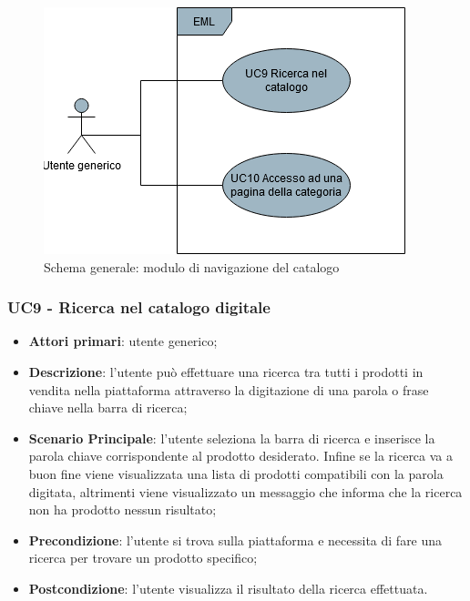 \begin{figure}[H]
\centering
\includegraphics[scale=0.6]{res/UseCase/Immagini/NavigazioneCatalogoGenerale}
\caption{Schema generale: modulo di navigazione del catalogo}
\end{figure}
\subsubsection{UC9 - Ricerca nel catalogo digitale}
\begin{itemize}
\item \textbf{Attori primari}: utente generico;
\item \textbf{Descrizione}: l'utente può effettuare una ricerca tra tutti i prodotti in vendita nella piattaforma attraverso la digitazione di una parola o frase chiave nella barra di ricerca;
\item \textbf{Scenario Principale}: l'utente seleziona la barra di ricerca e inserisce la parola chiave corrispondente al prodotto desiderato. Infine se la ricerca va a buon fine viene visualizzata una lista di prodotti compatibili con la parola digitata, altrimenti viene visualizzato un messaggio che informa che la ricerca non ha prodotto nessun risultato;
\item \textbf{Precondizione}: l'utente si trova sulla piattaforma e necessita di fare una ricerca per trovare un prodotto specifico;
\item \textbf{Postcondizione}: l'utente visualizza il risultato della ricerca effettuata.
\end{itemize}
